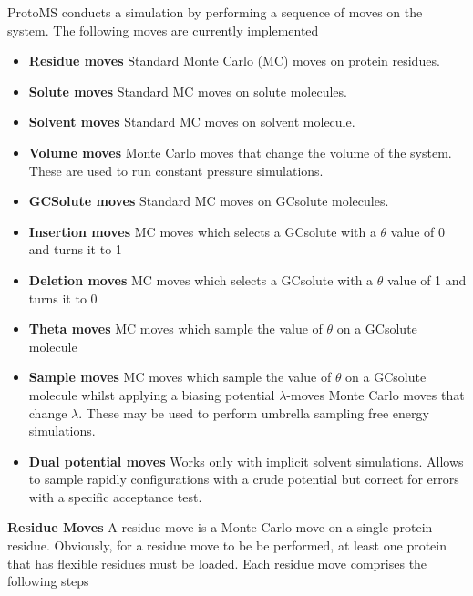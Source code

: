 \documentclass[letterpaper,10pt,english]{manual}
\begin{document}
ProtoMS conducts a simulation by performing a sequence of moves on the system. The following moves are currently implemented
\begin{itemize}
\item {} 
\textbf{Residue moves} Standard Monte Carlo (MC) moves on protein residues.

\item {} 
\textbf{Solute moves} Standard MC moves on solute molecules.

\item {} 
\textbf{Solvent moves} Standard MC moves on solvent molecule.

\item {} 
\textbf{Volume moves} Monte Carlo moves that change the volume of the system. These are used to run constant pressure simulations.

\item {} 
\textbf{GCSolute moves} Standard MC moves on GCsolute molecules.

\item {} 
\textbf{Insertion moves} MC moves which selects a GCsolute with a \(\theta\) value of 0 and turns it to 1

\item {} 
\textbf{Deletion moves} MC moves which selects a GCsolute with a \(\theta\) value of 1 and turns it to 0

\item {} 
\textbf{Theta moves} MC moves which sample the value of \(\theta\) on a GCsolute molecule

\item {} 
\textbf{Sample moves} MC moves which sample the value of \(\theta\) on a GCsolute molecule whilst applying a biasing potential $\lambda$-moves Monte Carlo moves that change $\lambda$. These may be used to perform umbrella sampling free energy simulations.

\item {} 
\textbf{Dual potential moves} Works only with implicit solvent simulations. Allows to sample rapidly configurations with a crude potential but correct for errors with a specific acceptance test.

\end{itemize}
\textbf{Residue Moves}
A residue move is a Monte Carlo move on a single protein residue. Obviously, for a residue move to be be performed, at least one protein that has flexible residues must be loaded. Each residue move comprises the following steps
\end{document}
